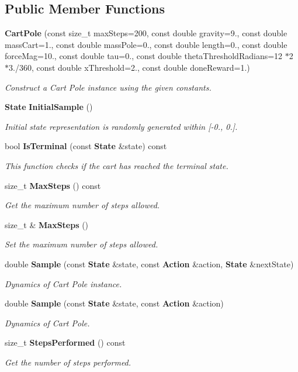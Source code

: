 \subsection*{Public Member Functions}
\begin{DoxyCompactItemize}
\item 
\textbf{ Cart\+Pole} (const size\+\_\+t max\+Steps=200, const double gravity=9., const double mass\+Cart=1., const double mass\+Pole=0., const double length=0., const double force\+Mag=10., const double tau=0., const double theta\+Threshold\+Radians=12 $\ast$2 $\ast$3./360, const double x\+Threshold=2., const double done\+Reward=1.)
\begin{DoxyCompactList}\small\item\em Construct a Cart Pole instance using the given constants. \end{DoxyCompactList}\item 
\textbf{ State} \textbf{ Initial\+Sample} ()
\begin{DoxyCompactList}\small\item\em Initial state representation is randomly generated within [-\/0., 0.]. \end{DoxyCompactList}\item 
bool \textbf{ Is\+Terminal} (const \textbf{ State} \&state) const
\begin{DoxyCompactList}\small\item\em This function checks if the cart has reached the terminal state. \end{DoxyCompactList}\item 
size\+\_\+t \textbf{ Max\+Steps} () const
\begin{DoxyCompactList}\small\item\em Get the maximum number of steps allowed. \end{DoxyCompactList}\item 
size\+\_\+t \& \textbf{ Max\+Steps} ()
\begin{DoxyCompactList}\small\item\em Set the maximum number of steps allowed. \end{DoxyCompactList}\item 
double \textbf{ Sample} (const \textbf{ State} \&state, const \textbf{ Action} \&action, \textbf{ State} \&next\+State)
\begin{DoxyCompactList}\small\item\em Dynamics of Cart Pole instance. \end{DoxyCompactList}\item 
double \textbf{ Sample} (const \textbf{ State} \&state, const \textbf{ Action} \&action)
\begin{DoxyCompactList}\small\item\em Dynamics of Cart Pole. \end{DoxyCompactList}\item 
size\+\_\+t \textbf{ Steps\+Performed} () const
\begin{DoxyCompactList}\small\item\em Get the number of steps performed. \end{DoxyCompactList}\end{DoxyCompactItemize}


